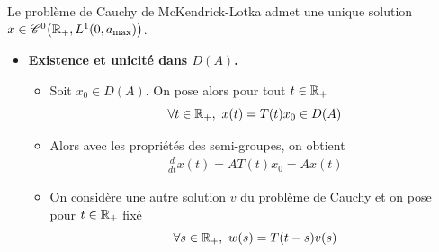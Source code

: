 \begin{frame}
    \begin{theorem}
        Le problème de Cauchy de McKendrick-Lotka admet une unique solution $x \in \mathscr{C}^0\big(\mathbb{R}_+, L^1(0,a_{\max})\big)$.
    \end{theorem}
    \pause
    \begin{itemize}
        \item \textbf{Existence et unicité dans $D(A)$.}\pause
        \begin{itemize}
            \item[$\triangleright$] Soit $x_0 \in D(A)$. On pose alors pour tout $t \in \mathbb{R}_+$
            \begin{equation*}
                \forall t \in \mathbb{R}_+, \ x(t) = T(t)x_0 \in D(A)
            \end{equation*}\pause
            \item[$\triangleright$] Alors avec les propriétés des semi-groupes, on obtient 
            \begin{eqnarray*}
                \frac{d}{d t}x(t) = AT(t)x_0 = Ax(t)
            \end{eqnarray*}\pause
            \item[$\triangleright$] On considère une autre solution $v$ du problème de Cauchy et on pose pour $t \in \mathbb{R}_+$ fixé
            \begin{equation*}
                \forall s \in \bbR_+, \ w(s) = T(t-s)v(s)
            \end{equation*}
        \end{itemize}
    \end{itemize}
\end{frame}

